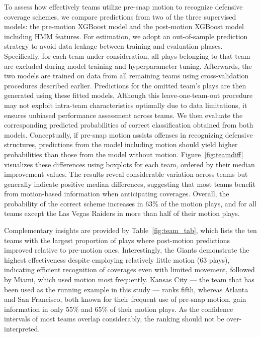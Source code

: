 \documentclass[namedate,webpdf,modern,medium]{oup-authoring-template}
\begin{document}
To assess how effectively teams utilize pre-snap motion to recognize defensive coverage schemes, we compare predictions from two of the three supervised models: the pre-motion XGBoost model and the post-motion XGBoost model including HMM features. For estimation, we adopt an out-of-sample prediction strategy to avoid data leakage between training and evaluation phases. Specifically, for each team under consideration, all plays belonging to that team are excluded during model training and hyperparameter tuning. Afterwards, the two models are trained on data from all remaining teams using cross-validation procedures described earlier. Predictions for the omitted team’s plays are then generated using these fitted models. Although this leave-one-team-out procedure may not exploit intra-team characteristics optimally due to data limitations, it ensures unbiased performance assessment across teams. We then evaluate the corresponding predicted probabilities of correct classification obtained from both models. Conceptually, if pre-snap motion assists offenses in recognizing defensive structures, predictions from the model including motion should yield higher probabilities than those from the model without motion.
Figure~\ref{fig:teamdiff} visualizes these differences using boxplots for each team, ordered by their median improvement values. The results reveal considerable variation across teams but generally indicate positive median differences, suggesting that most teams benefit from motion-based information when anticipating coverages. Overall, the probability of the correct scheme increases in 63\% of the motion plays, and for all teams except the Las Vegas Raiders in more than half of their motion plays.

Complementary insights are provided by Table~\ref{fig:team_tab}, which lists the ten teams with the largest proportion of plays where post-motion predictions improved relative to pre-motion ones. Interestingly, the Giants demonstrate the highest effectiveness despite employing relatively little motion (63 plays), indicating efficient recognition of coverages even with limited movement, followed by Miami, which used motion most frequently. Kansas City --- the team that has been used as the running example in this study --- ranks fifth, whereas Atlanta and San Francisco, both known for their frequent use of pre-snap motion, gain information in only 55\% and 65\% of their motion plays. As the confidence intervals of most teams overlap considerably, the ranking should not be over-interpreted.
\end{document}
